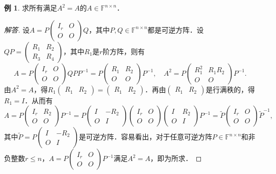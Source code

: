 \documentclass[a4paper,fontset=windows]{ctexbook}
\theoremstyle{definition}
\newtheorem{example}{例}[chapter]
\renewcommand{\le}{\leqslant}
\begin{document}
\begin{example}
求所有满足$A^2=A$的$A\in\mathbb{F}^{n\times n}$．
\end{example}

\begin{proof}[解答]
设$A=P\begin{pmatrix}I_r&O \\ O&O\end{pmatrix}Q$，其中$P,Q\in\mathbb{F}^{n\times n}$都是可逆方阵．设$QP=\begin{pmatrix}R_1&R_2 \\ R_3&R_4\end{pmatrix}$，其中$R_1$是$r$阶方阵，则有
$$A=P\begin{pmatrix}I_r&O \\ O&O\end{pmatrix}QPP^{-1}=P\begin{pmatrix}R_1&R_2 \\ O&O\end{pmatrix}P^{-1},\quad A^2=P\begin{pmatrix}R_1^2&R_1R_2 \\ O&O\end{pmatrix}P^{-1}.$$
由$A^2=A$，得$R_1\begin{pmatrix}R_1&R_2\end{pmatrix}=\begin{pmatrix}R_1&R_2\end{pmatrix}$．再由$\begin{pmatrix}R_1&R_2\end{pmatrix}$是行满秩的，得$R_1=I$．从而有
$$A=P\begin{pmatrix}I_r&R_2 \\ O&O\end{pmatrix}P^{-1}=P\begin{pmatrix}I&-R_2 \\ O&I\end{pmatrix}\begin{pmatrix}I_r&O \\ O&O\end{pmatrix}\begin{pmatrix}I&R_2 \\ O&I\end{pmatrix}P^{-1}=\widetilde{P}\begin{pmatrix}I_r&O \\ O&O\end{pmatrix}\widetilde{P}^{-1},$$
其中$\widetilde{P}=P\begin{pmatrix}I&-R_2 \\ O&I\end{pmatrix}$是可逆方阵．容易看出，对于任意可逆方阵$P\in\mathbb{F}^{n\times n}$和非负整数$r\le n$，$A=P\begin{pmatrix}I_r&O \\ O&O\end{pmatrix}P^{-1}$满足$A^2=A$，即为所求．
\end{proof}
\end{document}
